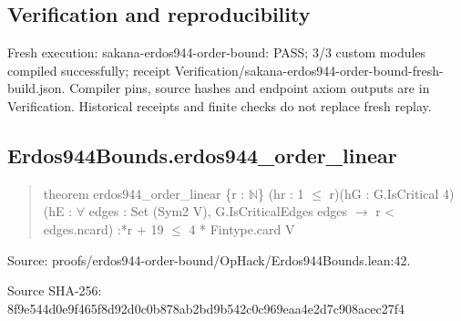 \documentclass[11pt,a4paper]{article}
\begin{document}
\subsection{Verification and reproducibility}
Fresh execution: sakana-erdos944-order-bound: PASS; 3/3 custom modules compiled successfully; receipt Verification/sakana-erdos944-order-bound-fresh-build.json. Compiler pins, source hashes and endpoint axiom outputs are in Verification. Historical receipts and finite checks do not replace fresh replay.

\begin{samepage}
\subsection{Erdos944Bounds.erdos944\_order\_linear}
\begin{quote}\small\ttfamily theorem erdos944\_order\_linear \{r : \ensuremath{\mathbb{N}}\} (hr : 1 \ensuremath{\leq} r)\newline     (hG : G.IsCritical 4)\newline     (hE : \ensuremath{\forall} edges : Set (Sym2 V), G.IsCriticalEdges edges \ensuremath{\to} r < edges.ncard) :*r + 19 \ensuremath{\leq} 4 * Fintype.card V\end{quote}
{\small Source: proofs/erdos944-order-bound/OpHack/Erdos944Bounds.lean:42.\par}

{\small Source SHA-256: 8f9e544d0e9f465f8d92d0c0b878ab2bd9b542c0c969eaa4e2d7c908acec27f4\par}

\end{samepage}
\end{document}
